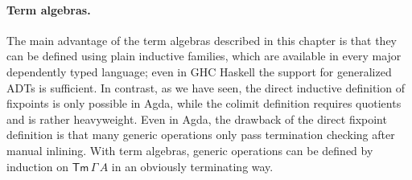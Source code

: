 \documentclass[12pt,a4paper,twoside,openany]{book}
\theoremstyle{remark}
\theoremstyle{definition}
\newcommand{\Tm}{\mathsf{Tm}}
\begin{document}
\paragraph{Term algebras.}
The main advantage of the term algebras described in this chapter is that they
can be defined using plain inductive families, which are available in every
major dependently typed language; even in GHC Haskell the support for
generalized ADTs is sufficient. In contrast, as we have seen, the direct
inductive definition of fixpoints is only possible in Agda, while the colimit
definition requires quotients and is rather heavyweight. Even in Agda, the
drawback of the direct fixpoint definition is that many generic operations only
pass termination checking after manual inlining. With term algebras, generic
operations can be defined by induction on $\Tm\,\Gamma\,A$ in an obviously
terminating way.
\end{document}
